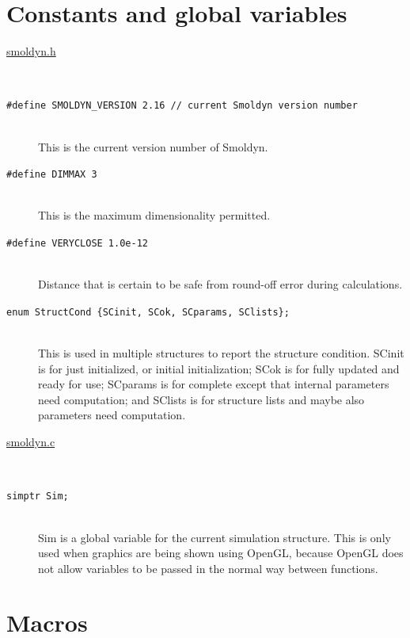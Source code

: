 \documentclass {scrbook}
\newcommand {\ttt} {\texttt}
\begin{document}
\section{Constants and global variables}


\begin{description}

\item[\underline{smoldyn.h}]
\hfill \\

\item[\ttt{\#define SMOLDYN\_VERSION 2.16 // current Smoldyn version number}]
\hfill \\
This is the current version number of Smoldyn.
	
\item[\ttt{\#define DIMMAX 3}]
\hfill \\
This is the maximum dimensionality permitted.

\item[\ttt{\#define VERYCLOSE 1.0e-12}]
\hfill \\
Distance that is certain to be safe from round-off error during calculations.

\item[\ttt{enum StructCond \{SCinit, SCok, SCparams, SClists\};}]
\hfill \\
This is used in multiple structures to report the structure condition. SCinit is for just initialized, or initial initialization; SCok is for fully updated and ready for use; SCparams is for complete except that internal parameters need computation; and SClists is for structure lists and maybe also parameters need computation.

\item[\underline{smoldyn.c}]
\hfill \\

\item[\ttt{simptr Sim;}]
\hfill \\
Sim is a global variable for the current simulation structure. This is only used when graphics are being shown using OpenGL, because OpenGL does not allow variables to be passed in the normal way between functions.

\end{description}

\section{Macros}
\end{document}
